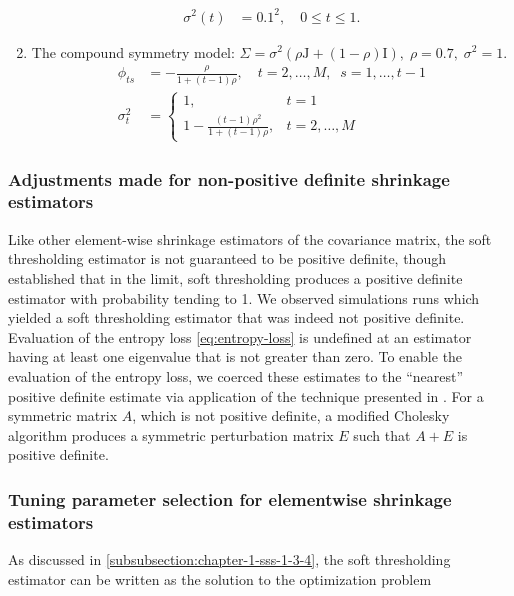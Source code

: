 \documentclass[12pt]{article}
\theoremstyle{definition}
\begin{document}
\begin{enumerate}
\begin{align*}
\sigma^2\left(t\right) &= 0.1^2, \quad 0 \le t \le 1.
\end{align*}
\item \label{item:cov-type-5} The compound symmetry model: $\Sigma = \sigma^2\left(\rho \mathrm{J} + \left(1-\rho\right)\mathrm{I}\right),\; \rho=0.7,\;\sigma^2=1$. 
\begin{align*}
\phi_{ts} &= -\frac{\rho}{1 + \left(t-1\right)\rho}, \quad t = 2, \dots, M,\;\; s = 1, \dots, t-1\\
\sigma_t^2 &= \left\{\begin{array}{ll} 1, & t = 1\\ 1 -\frac{\left(t-1\right)\rho^2}{1 + \left(t-1\right)\rho}, & t = 2, \dots, M \end{array}\right.
\end{align*}
\end{enumerate}


\subsubsection{Adjustments made for non-positive definite shrinkage estimators}

Like other element-wise shrinkage estimators of the covariance matrix, the soft thresholding estimator is not guaranteed to be positive definite, though \citet{rothman2009generalized} established that in the limit, soft thresholding produces a positive definite estimator with probability tending to 1.  We observed simulations runs which yielded a soft thresholding estimator that was indeed not positive definite.   Evaluation of the entropy loss \ref{eq:entropy-loss} is undefined at an estimator having at least one eigenvalue that is not greater than zero. To enable the evaluation of the entropy loss, we coerced these estimates to the ``nearest'' positive definite estimate via application of the technique presented in \citet{cheng1998modified}.  For a symmetric matrix $A$, which is not positive definite,  a modified Cholesky algorithm produces a symmetric perturbation matrix $E$ such that $A + E$ is positive definite.

\subsubsection{Tuning parameter selection for elementwise shrinkage estimators}

As discussed in \ref{subsubsection:chapter-1-sss-1-3-4}, the soft thresholding estimator can be written as the solution to the optimization problem
\end{document}
